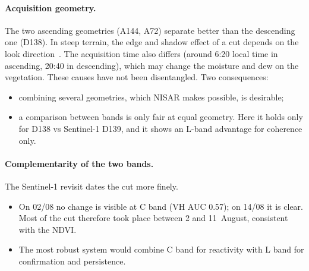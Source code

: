 \documentclass[11pt,a4paper]{article}
\begin{document}
\paragraph{Acquisition geometry.} The two ascending geometries (A144, A72) separate better than the descending one
(D138). In steep terrain, the edge and shadow effect of a cut depends on the look direction~\cite{bouvet2018shadow}.
The acquisition time also differs (around 6:20 local time in ascending, 20:40 in descending), which may change the
moisture and dew on the vegetation. These causes have not been disentangled. Two consequences:
\begin{itemize}
\item combining several geometries, which NISAR makes possible, is desirable;
\item a comparison between bands is only fair at equal geometry. Here it holds only for D138 vs Sentinel-1 D139, and
  it shows an L-band advantage for coherence only.
\end{itemize}

\paragraph{Complementarity of the two bands.} The Sentinel-1 revisit dates the cut more finely.
\begin{itemize}
\item On 02/08 no change is visible at C band (VH AUC 0.57); on 14/08 it is clear. Most of the cut therefore took
  place between 2 and 11~August, consistent with the NDVI.
\item The most robust system would combine C band for reactivity with L band for confirmation and persistence.
\end{itemize}
\end{document}

